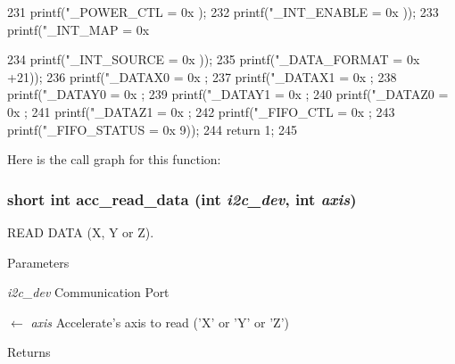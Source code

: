 \begin{DoxyCode}
{231   printf("\nACC_POWER_CTL = 0x%
      );
232   printf("\nACC_INT_ENABLE = 0x%
      ));
233   printf("\nACC_INT_MAP = 0x%
      
234   printf("\nACC_INT_SOURCE = 0x%
      ));
235   printf("\nACC_DATA_FORMAT = 0x%
      +21));
236   printf("\nACC_DATAX0 = 0x%
      ;
237   printf("\nACC_DATAX1 = 0x%
      ;
238   printf("\nACC_DATAY0 = 0x%
      ;
239   printf("\nACC_DATAY1 = 0x%
      ;
240   printf("\nACC_DATAZ0 = 0x%
      ;
241   printf("\nACC_DATAZ1 = 0x%
      ;
242   printf("\nACC_FIFO_CTL = 0x%
      ;
243   printf("\nACC_FIFO_STATUS = 0x%
      9));
244   return 1;
245 }
\end{DoxyCode}




Here is the call graph for this function:

\hypertarget{group__acc_ga041d6953f2bfc8c5efa4d5bbac812305}{
\subsubsection[{acc\_\-read\_\-data}]{\setlength{\rightskip}{0pt plus 5cm}short int acc\_\-read\_\-data (int {\em i2c\_\-dev}, \/  int {\em axis})}}
\label{group__acc_ga041d6953f2bfc8c5efa4d5bbac812305}


READ DATA (X, Y or Z). 


\begin{DoxyParams}{Parameters}
\item[{\em i2c\_\-dev}]Communication Port \item[\mbox{$\leftarrow$} {\em axis}]Accelerate's axis to read ('X' or 'Y' or 'Z')\end{DoxyParams}
\begin{DoxyReturn}{Returns}

\end{DoxyReturn}


